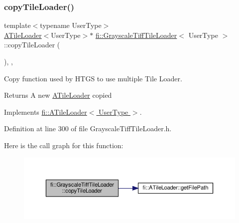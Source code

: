\subsubsection{\texorpdfstring{copy\+Tile\+Loader()}{copyTileLoader()}}
{\footnotesize\ttfamily template$<$typename User\+Type$>$ \\
\hyperlink{classfi_1_1ATileLoader}{A\+Tile\+Loader}$<$User\+Type$>$$\ast$ \hyperlink{classfi_1_1GrayscaleTiffTileLoader}{fi\+::\+Grayscale\+Tiff\+Tile\+Loader}$<$ User\+Type $>$\+::copy\+Tile\+Loader (\begin{DoxyParamCaption}{ }\end{DoxyParamCaption})\hspace{0.3cm}{\ttfamily [inline]}, {\ttfamily [override]}, {\ttfamily [virtual]}}



Copy function used by H\+T\+GS to use multiple Tile Loader. 

\begin{DoxyReturn}{Returns}
A new \hyperlink{classfi_1_1ATileLoader}{A\+Tile\+Loader} copied 
\end{DoxyReturn}


Implements \hyperlink{classfi_1_1ATileLoader_a99bd30a8283474c5bf667054a83a008d}{fi\+::\+A\+Tile\+Loader$<$ User\+Type $>$}.



Definition at line 300 of file Grayscale\+Tiff\+Tile\+Loader.\+h.

Here is the call graph for this function\+:
\nopagebreak
\begin{figure}[H]
\begin{center}
\leavevmode
\includegraphics[width=350pt]{dc/dcf/classfi_1_1GrayscaleTiffTileLoader_a57eb82e8bcdf71d2cd5f16f93bbe24a4_cgraph}
\end{center}
\end{figure}
\mbox{\label{classfi_1_1GrayscaleTiffTileLoader_a80ae5ca350571d2c993a68d40bdc39c9}} 
